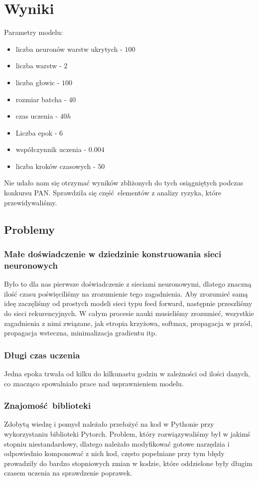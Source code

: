 \newpage
\section{Wyniki}

Parametry modelu:
\begin{itemize}
	  \item liczba neuronów warstw ukrytych - $100$
	  \item liczba warstw - $2$
	  \item liczba głowic - $100$
	  \item rozmiar batcha - $40$
	  \item czas uczenia - $40h$
	  \item Liczba epok - $6$
	  \item współczynnik uczenia - $0.004$
	  \item liczba kroków czasowych - $50$
	\end{itemize}
	
Nie udało nam się otrzymać wyników zbliżonych do tych osiągniętych podczas konkursu PAN. Sprawdziła się
część elementów z analizy ryzyka, które przewidywaliśmy.

\subsection{Problemy}
\subsubsection{Małe doświadczenie w dziedzinie konstruowania sieci neuronowych}
Było to dla nas pierwsze doświadczenie z sieciami neuronowymi, dlatego znaczną ilość czasu poświęciliśmy na 
zrozumienie tego zagadnienia. Aby zrozumieć samą ideę zaczęliśmy od prostych modeli sieci typu feed forward,
następnie przeszliśmy do sieci rekurencyjnych. W całym procesie nauki musieliśmy zrozumieć,
wszystkie zagadnienia z nimi związane, jak etropia krzyżowa, softmax, propagacja w przód, propagacja wsteczna, 
minimalizacja gradientu itp.

\subsubsection{Długi czas uczenia}
Jedna epoka trwała od kilku do kilkunastu godzin w zależności od ilości danych, co znacząco spowalniało 
prace nad usprawnieniem modelu. 

\subsubsection{Znajomość biblioteki}
Zdobytą wiedzę i pomysł należało przełożyć na kod w Pythonie przy wykorzystaniu biblioteki Pytorch. 
Problem, który rozwiązywaliśmy był w jakimś stopniu niestandardowy, dlatego należało modyfikować 
gotowe narzędzia i odpowiednio komponować z nich kod, często popełniane przy tym błędy prowadziły 
do bardzo stopniowych zmian w kodzie, które oddzielone były długim czasem uczenia na sprawdzenie poprawek.

